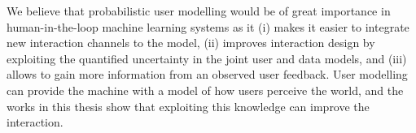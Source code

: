\documentclass[dissertation,math,vertlayout,pdfa,colorlinks]{aaltoseries}
\begin{document}

We believe that probabilistic user modelling would be of great importance in human-in-the-loop machine learning systems as it (i) makes it easier to integrate new interaction channels to the model, (ii) improves interaction design by exploiting the quantified uncertainty in the joint user and data models, and (iii) allows to gain more information from an observed user feedback. User modelling can provide the machine with a model of how users perceive the world, and the works in this thesis show that exploiting this knowledge can improve the interaction.









\end{document}
